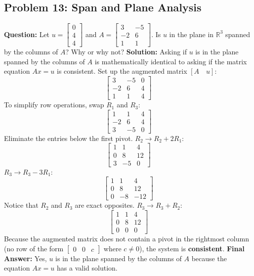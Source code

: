 \documentclass{article}
\begin{document}
\subsection{Problem 13: Span and Plane Analysis}
\textbf{Question:} Let $u = \begin{bmatrix} 0 \\ 4 \\ 4 \end{bmatrix}$ and $A = \begin{bmatrix} 3 & -5 \\ -2 & 6 \\ 1 & 1 \end{bmatrix}$. Is $u$ in the plane in $\mathbb{R}^3$ spanned by the columns of $A$? Why or why not?
\textbf{Solution:}
Asking if $u$ is in the plane spanned by the columns of $A$ is mathematically identical to asking if the matrix equation $Ax = u$ is consistent.
Set up the augmented matrix $[A \quad u]$:
\[ \begin{bmatrix} 3 & -5 & 0 \\ -2 & 6 & 4 \\ 1 & 1 & 4 \end{bmatrix} \]
To simplify row operations, swap $R_1$ and $R_3$:
\[ \begin{bmatrix} 1 & 1 & 4 \\ -2 & 6 & 4 \\ 3 & -5 & 0 \end{bmatrix} \]
Eliminate the entries below the first pivot. 
$R_2 \to R_2 + 2R_1$:
\[ \begin{bmatrix} 1 & 1 & 4 \\ 0 & 8 & 12 \\ 3 & -5 & 0 \end{bmatrix} \]
$R_3 \to R_3 - 3R_1$:
\[ \begin{bmatrix} 1 & 1 & 4 \\ 0 & 8 & 12 \\ 0 & -8 & -12 \end{bmatrix} \]
Notice that $R_2$ and $R_3$ are exact opposites.
$R_3 \to R_3 + R_2$:
\[ \begin{bmatrix} 1 & 1 & 4 \\ 0 & 8 & 12 \\ 0 & 0 & 0 \end{bmatrix} \]
Because the augmented matrix does not contain a pivot in the rightmost column (no row of the form $\begin{bmatrix} 0 & 0 & c \end{bmatrix}$ where $c \neq 0$), the system is \textbf{consistent}. 
\textbf{Final Answer:} Yes, $u$ is in the plane spanned by the columns of $A$ because the equation $Ax = u$ has a valid solution.
\end{document}
